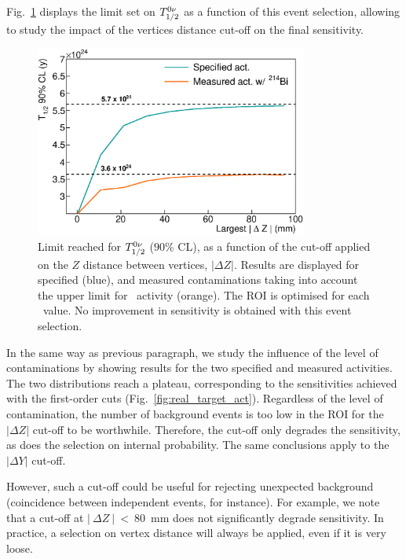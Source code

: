 Fig.~\ref{fig:cont_vertex} displays the limit set on $T_{1/2}^{0\nu}$ as a function of this event selection, allowing to study the impact of the vertices distance cut-off on the final sensitivity.
\begin{figure}[h!]
  \centering
  \includegraphics[width=0.8\textwidth]{Sensitivity/fig_sensitivity/contamination_vertex.eps}
  \caption{Limit reached for $T_{1/2}^{0\nu}$ ($90$\% CL), as a function of the cut-off applied on the $Z$ distance between vertices, $|\Delta Z|$.
    Results are displayed for specified (blue), and measured contaminations taking into account the upper limit for \Bi\ activity (orange).
    The ROI is optimised for each \Pint\ value.
    No improvement in sensitivity is obtained with this event selection.
    \label{fig:cont_vertex}}
\end{figure}
In the same way as previous paragraph, we study the influence of the level of contaminations by showing results for the two specified and measured activities.
The two distributions reach a plateau, corresponding to the sensitivities achieved with the first-order cuts (Fig.~\ref{fig:real_target_act}).
Regardless of the level of contamination, the number of background events is too low in the ROI for the $| \Delta Z|$ cut-off to be worthwhile.
Therefore, the cut-off only degrades the sensitivity, as does the selection on internal probability.
The same conclusions apply to the $| \Delta Y |$ cut-off.

However, such a cut-off could be useful for rejecting unexpected background (coincidence between independent events, for instance).
For example, we note that a cut-off at $|~\Delta Z~|~<~80$~mm does not significantly degrade sensitivity.
In practice, a selection on vertex distance will always be applied, even if it is very loose.

